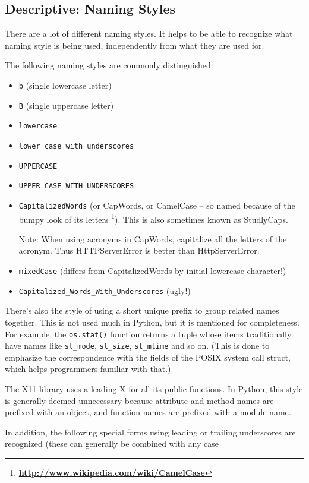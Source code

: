 \documentclass[a4paper,11pt]{article}
\begin{document}
\subsection{Descriptive: Naming Styles}
There are a lot of different naming styles. It helps to be able to recognize 
what naming style is being used, independently from what they are used for.
\par
The following naming styles are commonly distinguished:
\begin{itemize}
\item \verb"b" (single lowercase letter)
\item \verb"B" (single uppercase letter)
\item \verb"lowercase"
\item \verb"lower_case_with_underscores"
\item \verb"UPPERCASE"
\item \verb"UPPER_CASE_WITH_UNDERSCORES"
\item \verb"CapitalizedWords" (or CapWords, or CamelCase – so named because of
the bumpy look of its letters
\footnote{\href{http://www.wikipedia.com/wiki/CamelCase}
{\bf{http://www.wikipedia.com/wiki/CamelCase}}}). This is also
sometimes known as StudlyCaps.
\par
Note: When using acronyms in CapWords, capitalize all the letters of the 
acronym. Thus HTTPServerError is better than HttpServerError.
\item \verb"mixedCase" (differs from CapitalizedWords by initial lowercase
character!)
\item \verb"Capitalized_Words_With_Underscores" (ugly!)
\end{itemize}
There’s also the style of using a short unique prefix to group related names 
together. This is not used much in Python, but it is mentioned for 
completeness. For example, the \verb"os.stat()" function returns a tuple 
whose items traditionally have names like \verb"st_mode", \verb"st_size", 
\verb"st_mtime" and so on. (This is done to emphasize the correspondence with 
the fields of the POSIX system call struct, which helps programmers familiar 
with that.)
\par
The X11 library uses a leading X for all its public functions. In Python, 
this style is generally deemed unnecessary because attribute and method names 
are prefixed with an object, and function names are prefixed with a module 
name.
\par
In addition, the following special forms using leading or trailing 
underscores are recognized (these can generally be combined with any case 
\end{document}
